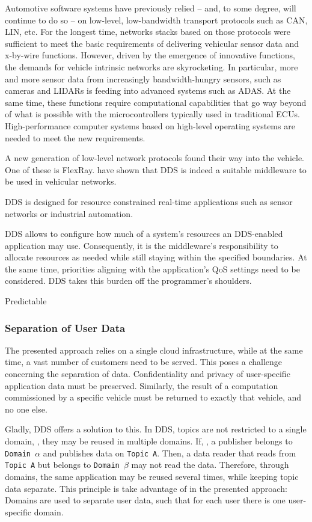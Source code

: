 Automotive software systems have previously relied -- and, to some degree, will continue to do so -- on low-level, low-bandwidth transport protocols such as CAN, LIN, etc. For the longest time, networks stacks based on those protocols were sufficient to meet the basic requirements of delivering vehicular sensor data and x-by-wire functions. However, driven by the emergence of innovative functions, the demands for vehicle intrinsic networks are skyrocketing. In particular, more and more sensor data from increasingly bandwidth-hungry sensors, such as cameras and LIDARs is feeding into advanced systems such as ADAS. At the same time, these functions require computational capabilities that go way beyond of what is possible with the microcontrollers typically used in traditional ECUs. High-performance computer systems based on high-level operating systems are needed to meet the new requirements.

A new generation of low-level network protocols found their way into the vehicle. One of these is FlexRay. \citeauthor*{bouhouch2013dds} have shown \cite{bouhouch2013dds} that DDS is indeed a suitable middleware to be used in vehicular networks.


DDS is designed for resource constrained real-time applications such as sensor networks or industrial automation.

DDS allows to configure how much of a system's resources an DDS-enabled application may use. Consequently, it is the middleware's responsibility to allocate resources as needed while still staying within the specified boundaries. At the same time, priorities aligning with the application's QoS settings need to be considered. DDS takes this burden off the programmer's shoulders.

Predictable


\subsubsection{Separation of User Data}

The presented approach relies on a single cloud infrastructure, while at the same time, a vast number of customers need to be served. This poses a challenge concerning the separation of data. Confidentiality and privacy of user-specific application data must be preserved. Similarly, the result of a computation commissioned by a specific vehicle must be returned to exactly that vehicle, and no one else. 

Gladly, DDS offers a solution to this. In DDS, topics are not restricted to a single domain, \ie , they may be reused in multiple domains. If, \eg , a publisher belongs to \texttt{Domain $\alpha$} and publishes data on \texttt{Topic A}. Then, a data reader that reads from \texttt{Topic A} but belongs to \texttt{Domain $\beta$} may not read the data. Therefore, through domains, the same application may be reused several times, while keeping topic data separate. This principle is take advantage of in the presented approach: Domains are used to separate user data, such that for each user there is one user-specific domain.




